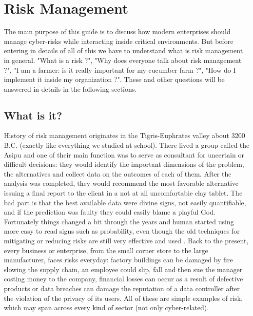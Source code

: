 \chapter{Risk Management}
The main purpose of this guide is to discuss how modern enterprises should manage cyber-risks while interacting inside critical environments. But before entering in details of all of this we have to understand what is risk management in general. "What is a risk ?", "Why does everyone talk about risk management ?", "I am a farmer: is it really important for my cucumber farm ?", "How do I implement it inside my organization ?". These and other questions will be answered in details in the following sections.
\section{What is it?}
History of risk management originates in the Tigris-Euphrates valley about 3200 B.C. (exactly like everything we studied at school). There lived a group called the Asipu and one of their main function was to serve as consultant for uncertain or difficult decisions: they would identify the important dimensions of the problem, the alternatives and collect data on the outcomes of each of them. After the analysis was completed, they would recommend the most favorable alternative issuing a final report to the client in a not at all uncomfortable clay tablet. The bad part is that the best available data were divine signs, not easily quantifiable, and if the prediction was faulty they could easily blame a playful God. Fortunately things changed a bit through the years and human started using more easy to read signs such as probability, even though the old techniques for mitigating or reducing risks are still very effective and used \cite{Covello1985}.
Back to the present, every business or enterprise, from the small corner store to the large manufacturer, faces risks everyday: factory buildings can be damaged by fire slowing the supply chain, an employee could slip, fall and then sue the manager costing money to the company, financial losses can occur as a result of defective products or data breaches can damage the reputation of a data controller after the violation of the privacy of its users.
All of these are simple examples of risk, which may span across every kind of sector (not only cyber-related).
